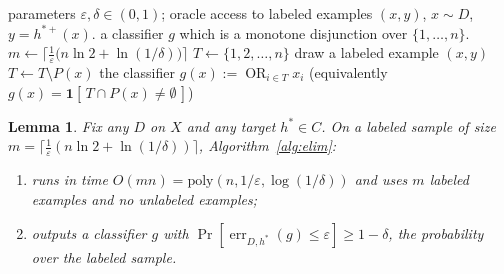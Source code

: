 \documentclass{amsart}
\newtheorem{lemma}{Lemma}
\theoremstyle{definition}
\DeclareMathOperator{\err}{err}
\DeclareMathOperator*{\OR}{OR}
\newcommand{\eps}{\varepsilon}
\begin{document}
\begin{algorithm}[h]
\caption{Elimination learner for the classifier of $C$}\label{alg:elim}
\begin{algorithmic}[1]
  \Require parameters $\eps,\delta\in(0,1)$; oracle access to labeled examples
           $(x,y)$, $x\sim D$, $y=h^{\ast+}(x)$.
  \Ensure a classifier $g$ which is a monotone disjunction over $\{1,\dots,n\}$.
  \State $m \gets \bigl\lceil \tfrac1\eps\bigl(n\ln 2+\ln(1/\delta)\bigr)\bigr\rceil$
  \State $T \gets \{1,2,\dots,n\}$
     \State draw a labeled example $(x,y)$
      
        \State $T \gets T \setminus P(x)$
     \EndIf
  \EndFor
  \State \Return the classifier $g(x):=\OR_{i\in T} x_i$
         \big(equivalently $g(x)=\mathbf 1[\,T\cap P(x)\neq\emptyset\,]$\big)
\end{algorithmic}
\end{algorithm}

\begin{lemma}\label{lem:upper}
Fix any $D$ on $X$ and any target $h^\ast\in C$. On a labeled sample of size
$m=\lceil\frac1\eps(n\ln2+\ln(1/\delta))\rceil$, Algorithm~\ref{alg:elim}:
\begin{enumerate}
\item runs in time $O(mn)=\mathrm{poly}(n,1/\eps,\log(1/\delta))$ and uses $m$
labeled examples and no unlabeled examples;
\item outputs a classifier $g$ with
$\Pr[\err_{D,h^\ast}(g)\le\eps]\ge 1-\delta$,
the probability over the labeled sample.
\end{enumerate}
\end{lemma}
\end{document}
